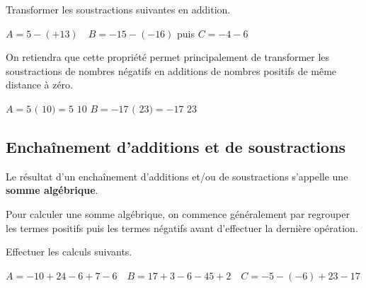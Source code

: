 \documentclass[a4paper]{book}
\begin{document}
    \begin{exemple}
        Transformer les soustractions suivantes en addition.
        
        $A = 5 - (+13) \quad B = -15 - (-16)$ puis $C = - 4 - 6$
    \end{exemple}

    \begin{methode}
        On retiendra que cette propriété permet principalement de transformer les soustractions de nombres négatifs en additions de nombres positifs de même distance à zéro.

        \setlength{\fboxsep}{0.7ex}
        $A= 5$ \fbox{-} $\big( $ \fbox{-} $10\big)=5 $ \fbox{+} $ 10$ \quad $B= -17$ \fbox{-} $\big( $ \fbox{-} $23\big)=-17 $ \fbox{+} $ 23$ \quad 
    \end{methode}


\subsection{Enchaînement d'additions et de soustractions}
    
    \begin{definition}
        Le résultat d'un enchaînement d’additions et/ou de soustractions s'appelle une \textbf{somme algébrique}.
    \end{definition}

    \begin{methode}
        Pour calculer une somme algébrique, on commence généralement par regrouper les termes positifs puis les termes négatifs avant d'effectuer la dernière opération.
    \end{methode}

    \begin{exemple}
        Effectuer les calculs suivants.

        $A=-10+24-6+7-6 \quad B=17+3-6-45+2 \quad C=-5-(-6)+23-17$
    \end{exemple}
\end{document}
